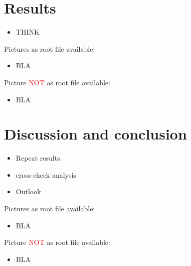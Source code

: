 \chapter{Results}

\begin{itemize}
\item THINK
\end{itemize}

Pictures as root file available:
\begin{itemize}
\item BLA
\end{itemize}

Picture \textcolor{red}{NOT} as root file available:
\begin{itemize}
\item BLA
\end{itemize}

\chapter{Discussion and conclusion}

\begin{itemize}
\item Repeat results
\item cross-check analysis
\item Outlook
\end{itemize}

Pictures as root file available:
\begin{itemize}
\item BLA
\end{itemize}

Picture \textcolor{red}{NOT} as root file available:
\begin{itemize}
\item BLA
\end{itemize}
